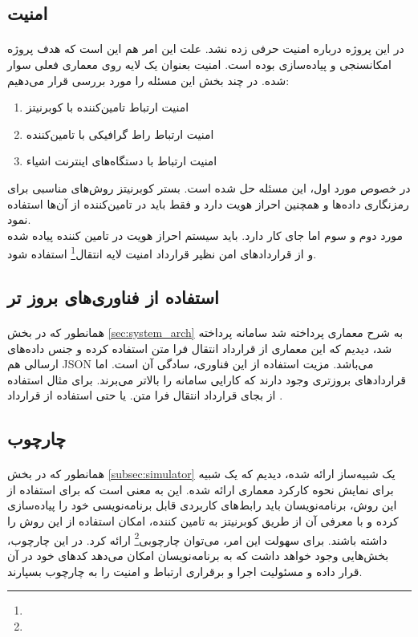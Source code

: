 \subsection{امنیت}
\label{subsec:security}
\paragraph{}
{
      در این پروژه درباره امنیت حرفی زده نشد. علت این امر هم این است که هدف پروژه امکانسنجی و پیاده‌سازی بوده است.
      امنیت بعنوان یک لایه روی معماری فعلی سوار شده. در چند بخش این مسئله را مورد بررسی قرار می‌دهیم:
      \begin{enumerate}
            \item امنیت ارتباط تامین‌کننده با کوبرنیتز
            \item امنیت ارتباط راط گرافیکی با تامین‌کننده
            \item امنیت ارتباط با دستگاه‌های اینترنت اشیاء
      \end{enumerate}

      در خصوص مورد اول، این مسئله حل شده است. بستر کوبرنیتز روش‌های مناسبی برای رمز‌نگاری داده‌ها و همچنین احراز هویت دارد و فقط باید در تامین‌کننده از آن‌ها استفاده نمود.
      \\
      مورد دوم و سوم اما جای کار دارد. باید سیستم احراز هویت در تامین کننده پیاده شده و از قراردادهای امن نظیر قرارداد امنیت لایه انتقال\footnote{} استفاده شود.
}

\subsection{استفاده از فناوری‌های بروز تر}
\label{subsec:newer_tech}
\paragraph{}
{
      همانطور که در بخش
      \ref{sec:system_arch} به شرح معماری پرداخته شد سامانه پرداخته شد، 
      دیدیم که این معماری از قرارداد انتقال فرا متن استفاده کرده و جنس داده‌های ارسالی هم JSON می‌باشد. 
      مزیت استفاده از این فناوری، سادگی‌ آن است. اما قرارداد‌های بروزتری وجود دارند که کارایی سامانه را بالاتر می‌برند.
      برای مثال استفاده از  بجای قرارداد انتقال فرا متن. یا حتی استفاده از قرارداد .
}

\subsection{چارچوب}
\label{subsec:framework}
\paragraph{}
{
      همانطور که در بخش
      \ref{subsec:simulator} یک شبیه‌ساز ارائه شده،
      دیدیم که یک شبیه‌ برای نمایش نحوه کارکرد معماری ارائه شده.
      این به معنی است که برای استفاده از این روش، برنامه‌نویسان باید رابط‌های کاربردی قابل برنامه‌نویسی خود را
      پیاده‌سازی کرده و با معرفی آن از طریق کوبرنیتز به تامین کننده، امکان استفاده از این روش را داشته باشند.
      برای سهولت این امر، می‌توان چارچوبی\footnote{} ارائه کرد.
      در این چارچوب، بخش‌هایی وجود خواهد داشت که به برنامه‌نویسان امکان می‌دهد کد‌های خود در آن قرار داده و مسئولیت
      اجرا و برقراری ارتباط و امنیت را به چارچوب بسپارند.
}